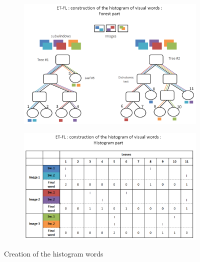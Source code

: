 \documentclass[a4paper]{report}
\begin{document}
		\begin{figure}
			\begin{subfigure}{.5\textwidth}
				\centering
				\includegraphics[width=1.\linewidth]{images/ETFLHisto1.png}
				\caption{\label{fig:ETFLHisto1}}
			\end{subfigure}%
			\begin{subfigure}{.5\textwidth}
				\centering
				\includegraphics[width=1.\linewidth]{images/ETFLHisto2.png}
				\caption{\label{fig:ETFLHisto2}}
			\end{subfigure}
			\caption{\label{fig:ETFLHisto}Creation of the histogram words}			
	\end{figure}
	
\end{document}
